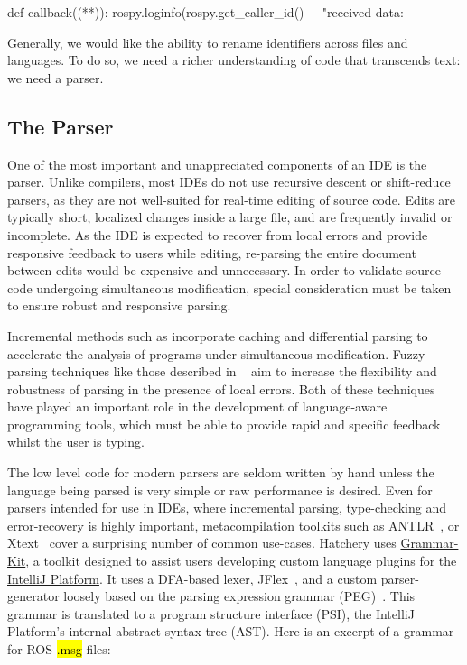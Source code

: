 \documentclass[12pt,initial,twoside,maitrise]{dms}
\newcommand{\inline}[1]{%
\begingroup%
\sethlcolor{slightgray}%
\hl{\ttfamily\small #1}%
\endgroup
}
\numberwithin{equation}{section}
\numberwithin{table}{chapter}
\numberwithin{figure}{chapter}
\begin{document}
\begin{pythonlisting}
def callback((**)):
    rospy.loginfo(rospy.get_caller_id() + "received data: %
\end{pythonlisting}
%
Generally, we would like the ability to rename identifiers across files and languages. To do so, we need a richer understanding of code that transcends text: we need a parser.

\subsection{The Parser}\label{subsec:the-parser}

One of the most important and unappreciated components of an IDE is the parser. Unlike compilers, most IDEs do not use recursive descent or shift-reduce parsers, as they are not well-suited for real-time editing of source code. Edits are typically short, localized changes inside a large file, and are frequently invalid or incomplete. As the IDE is expected to recover from local errors and provide responsive feedback to users while editing, re-parsing the entire document between edits would be expensive and unnecessary. In order to validate source code undergoing simultaneous modification, special consideration must be taken to ensure robust and responsive parsing.

Incremental methods such as \citet{wagner1997practical,wagner1997incremental} incorporate caching and differential parsing to accelerate the analysis of programs under simultaneous modification. Fuzzy parsing techniques like those described in ~\citet{koppler1997systematic} aim to increase the flexibility and robustness of parsing in the presence of local errors. Both of these techniques have played an important role in the development of language-aware programming tools, which must be able to provide rapid and specific feedback whilst the user is typing.

The low level code for modern parsers are seldom written by hand unless the language being parsed is very simple or raw performance is desired. Even for parsers intended for use in IDEs, where incremental parsing, type-checking and error-recovery is highly important, metacompilation toolkits such as ANTLR~\citep{parr1995antlr}, or Xtext~\citep{eysholdt2010xtext} cover a surprising number of common use-cases. Hatchery uses \href{https://github.com/JetBrains/grammar-kit}{Grammar-Kit}, a toolkit designed to assist users developing custom language plugins for the \href{http://www.jetbrains.org/intellij/sdk/docs/welcome.html}{IntelliJ Platform}. It uses a DFA-based lexer, JFlex~\citep{klein2001jflex}, and a custom parser-generator loosely based on the parsing expression grammar (PEG)~\citep{ford2004parsing}. This grammar is translated to a program structure interface (PSI), the IntelliJ Platform's internal abstract syntax tree (AST). Here is an excerpt of a grammar for ROS \inline{.msg} files:
\end{document}
